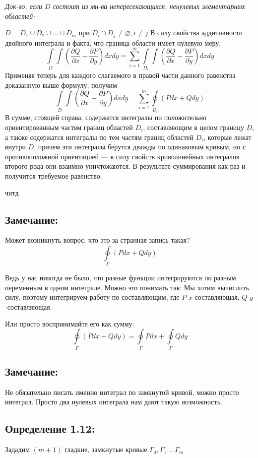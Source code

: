 \documentclass[12pt, english]{article}
\begin{document}
\textit{Док-во, если $D$ состоит из мн-ва непересекающихся, ненулевых элементарных областей:}

$
D = D_1 \cup D_2 \cup ... \cup D_m $ при $ D_i \cap D_j \neq  \varnothing, i \neq j
$
В силу свойства аддитивности двойного интеграла и факта, что граница области имеет нулевую меру:
$$
\int\limits_D \int (\frac{\partial Q}{\partial x} - \frac{\partial P}{\partial y}) dxdy
=
\sum_{i=1}^{m} \int\limits_{D_i} \int (\frac{\partial Q}{\partial x} - \frac{\partial P}{\partial y}) dxdy
$$
Применяя теперь для каждого слагаемого в правой части данного равенства доказанную выше формулу, получим
$$
\int\limits_D \int (\frac{\partial Q}{\partial x} - \frac{\partial P}{\partial y}) dxdy
= 
\sum_{i=1}^{m} \oint\limits_{D_i} (Pdx + Qdy) 
$$
В сумме, стоящей справа, содержатся интегралы по положительно ориентированным частям границ областей $D_i$, составляющим в целом границу $D$,
а также содержатся интегралы по тем частям границ областей  $D_i$, которые
лежат внутри  $D$, причем эти интегралы берутся дважды по одинаковым
кривым, но с противоположной ориентацией — в силу свойств криволинейных интегралов второго рода они взаимно уничтожаются. В результате
суммирования как раз и получится требуемое равенство.

читд
\subsection*{Замечание:}
Может возникнуть вопрос, что это за странная запись такая? 
$$
\oint\limits_{\Gamma}(Pdx + Qdy)
$$

Ведь у нас никогда не было, что разные функции интегрируются по разным переменным в одном интеграле. Можно это понимать так: Мы хотим вычислить силу, поэтому интегрируем работу по составляющим, где $P$ $x$-составляющая, $Q$ $y$-составляющая.
	
Или просто воспринимайте его как сумму:
$$
\oint\limits_{\Gamma} (Pdx + Qdy) =
\oint\limits_{\Gamma}Pdx + \oint\limits_{\Gamma} Qdy
$$

\subsection*{Замечание:}
	Не обязательно писать именно интеграл по замкнутой кривой, можно просто интеграл. Просто два нулевых интеграла нам дают такую возможность.
\newpage

\subsection*{Определение 1.12:}
	Зададим $(m+1)$ гладкие, замкнутые кривые $\Gamma_0 , \Gamma_1$ ...$\Gamma_m $
	
\end{document}
